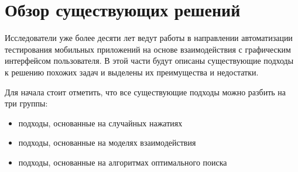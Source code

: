 \section{Обзор существующих решений}
\label{sec:Chapter2} 

Исследователи уже более десяти лет ведут работы в направлении автоматизации тестирования мобильных приложений на основе взаимодействия с графическим интерфейсом пользователя. В этой части будут описаны существующие подходы к решению похожих задач и выделены их преимущества и недостатки.

Для начала стоит отметить, что все существующие подходы можно разбить на три группы:

\begin{itemize}

\item подходы, основанные на случайных нажатиях
 
\item подходы, основанные на моделях взаимодействия
 
\item подходы, основанные на алгоритмах оптимального поиска

\end{itemize}

